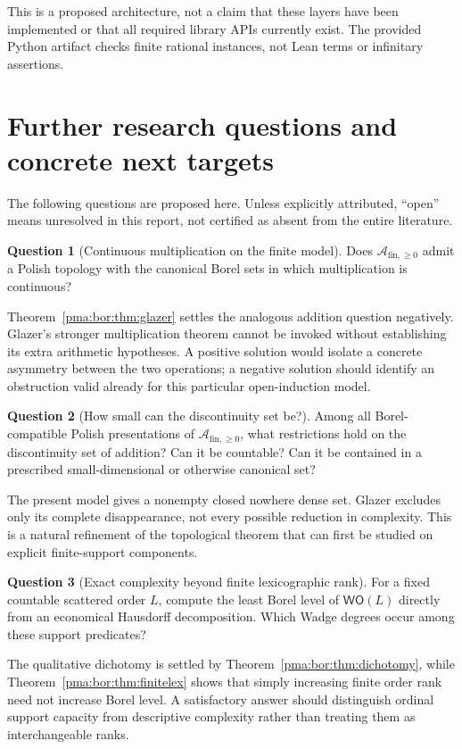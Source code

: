 \documentclass[11pt]{article}
\numberwithin{equation}{section}
\theoremstyle{definition}
\newtheorem{question}[question]{Question}
\theoremstyle{remark}
\newcommand{\WO}{\mathsf{WO}}
\newcommand{\PP}{\mathcal A_{\mathrm{fin},\geq 0}}
\begin{document}
This is a proposed architecture, not a claim that these layers have been
implemented or that all required library APIs currently exist. The provided
Python artifact checks finite rational instances, not Lean terms or
infinitary assertions.

\section{Further research questions and concrete next targets}
\label{pma:bor:sec:questions}

The following questions are proposed here. Unless explicitly attributed,
``open'' means unresolved in this report, not certified as absent from the
entire literature.

\begin{question}[Continuous multiplication on the finite model]
\label{pma:bor:q:multiplication}
Does $\PP$ admit a Polish topology with the canonical Borel sets in which
multiplication is continuous?
\end{question}
Theorem~\ref{pma:bor:thm:glazer} settles the analogous addition question negatively.
Glazer's stronger multiplication theorem cannot be invoked without establishing
its extra arithmetic hypotheses. A positive solution would isolate a concrete
asymmetry between the two operations; a negative solution should identify an
obstruction valid already for this particular open-induction model.

\begin{question}[How small can the discontinuity set be?]
Among all Borel-compatible Polish presentations of $\PP$, what restrictions
hold on the discontinuity set of addition? Can it be countable? Can it be
contained in a prescribed small-dimensional or otherwise canonical set?
\end{question}
The present model gives a nonempty closed nowhere dense set. Glazer excludes
only its complete disappearance, not every possible reduction in complexity.
This is a natural refinement of the topological theorem that can first be
studied on explicit finite-support components.

\begin{question}[Exact complexity beyond finite lexicographic rank]
For a fixed countable scattered order $L$, compute the least Borel level of
$\WO(L)$ directly from an economical Hausdorff decomposition. Which Wadge
degrees occur among these support predicates?
\end{question}
The qualitative dichotomy is settled by Theorem~\ref{pma:bor:thm:dichotomy}, while
Theorem~\ref{pma:bor:thm:finitelex} shows that simply increasing finite order rank need
not increase Borel level. A satisfactory answer should distinguish ordinal
support capacity from descriptive complexity rather than treating them as
interchangeable ranks.
\end{document}
